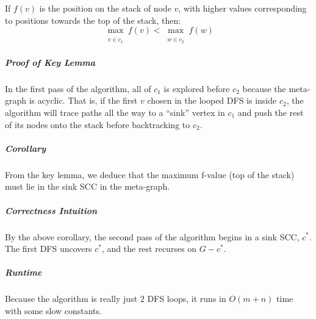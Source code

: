 \documentclass[11pt]{article}
\begin{document}
	If $f(v)$ is the position on the stack of node $v$, with higher values corresponding to positions towards the top of the stack, then:
	\begin{equation}
		\max_{\substack{ \\ v \in c_1}} f(v) < \max_{\substack{ \\ w \in c_2}} f(w)
	\end{equation}
	
	\subparagraph{Proof of Key Lemma} In the first pass of the algorithm, all of $c_1$ is explored before $c_2$ because the meta-graph is acyclic. That is, if the first $v$ chosen in the looped DFS is inside $c_2$, the algorithm will trace paths all the way to a ``sink'' vertex in $c_1$ and push the rest of its nodes onto the stack before backtracking to $c_2$.
	
	\subparagraph{Corollary} From the key lemma, we deduce that the maximum f-value (top of the stack) must lie in the sink SCC in the meta-graph.
	
	\begin{center}
	\end{center}
	
	\subparagraph{Correctness Intuition} By the above corollary, the second pass of the algorithm begins in a sink SCC, $c^*$. The first DFS uncovers $c^*$, and the rest recurses on $G-c^*$.
	
	\subparagraph{Runtime} Because the algorithm is really just 2 DFS loops, it runs in $O(m+n)$ time with some slow constants.

%		
%		


\end{document}
